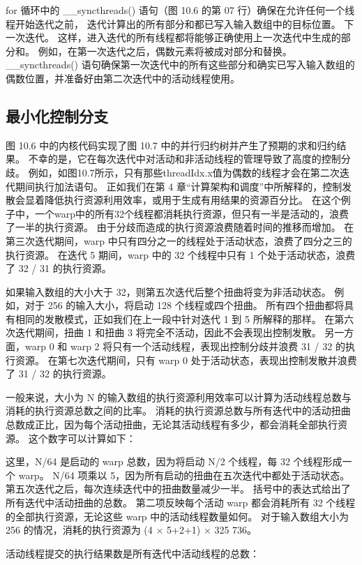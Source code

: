 for 循环中的 \_\_syncthreads() 语句（图 10.6 的第 07 行）确保在允许任何一个线程开始迭代之前，
迭代计算出的所有部分和都已写入输入数组中的目标位置。 下一次迭代。 
这样，进入迭代的所有线程都将能够正确使用上一次迭代中生成的部分和。 
例如，在第一次迭代之后，偶数元素将被成对部分和替换。 
\_\_syncthreads() 语句确保第一次迭代中的所有这些部分和确实已写入输入数组的偶数位置，并准备好由第二次迭代中的活动线程使用。

\subsection{最小化控制分支}
图 10.6 中的内核代码实现了图 10.7 中的并行归约树并产生了预期的求和归约结果。 
不幸的是，它在每次迭代中对活动和非活动线程的管理导致了高度的控制分歧。 
例如，如图10.7所示，只有那些threadIdx.x值为偶数的线程才会在第二次迭代期间执行加法语句。 
正如我们在第 4 章“计算架构和调度”中所解释的，控制发散会显着降低执行资源利用效率，或用于生成有用结果的资源百分比。 
在这个例子中，一个warp中的所有32个线程都消耗执行资源，但只有一半是活动的，浪费了一半的执行资源。 
由于分歧而造成的执行资源浪费随着时间的推移而增加。 
在第三次迭代期间，warp 中只有四分之一的线程处于活动状态，浪费了四分之三的执行资源。 
在迭代 5 期间，warp 中的 32 个线程中只有 1 个处于活动状态，浪费了 32 / 31 的执行资源。

如果输入数组的大小大于 32，则第五次迭代后整个扭曲将变为非活动状态。 
例如，对于 256 的输入大小，将启动 128 个线程或四个扭曲。 
所有四个扭曲都将具有相同的发散模式，正如我们在上一段中针对迭代 1 到 5 所解释的那样。
在第六次迭代期间，扭曲 1 和扭曲 3 将完全不活动，因此不会表现出控制发散。 
另一方面，warp 0 和 warp 2 将只有一个活动线程，表现出控制分歧并浪费 31 / 32 的执行资源。 
在第七次迭代期间，只有 warp 0 处于活动状态，表现出控制发散并浪费了 31 / 32 的执行资源。

一般来说，大小为 N 的输入数组的执行资源利用效率可以计算为活动线程总数与消耗的执行资源总数之间的比率。 
消耗的执行资源总数与所有迭代中的活动扭曲总数成正比，因为每个活动扭曲，无论其活动线程有多少，都会消耗全部执行资源。 
这个数字可以计算如下：

这里，N/64 是启动的 warp 总数，因为将启动 N/2 个线程，每 32 个线程形成一个 warp。 
N/64 项乘以 5，因为所有启动的扭曲在五次迭代中都处于活动状态。 第五次迭代之后，每次连续迭代中的扭曲数量减少一半。 
括号中的表达式给出了所有迭代中活动扭曲的总数。 
第二项反映每个活动 warp 都会消耗所有 32 个线程的全部执行资源，无论这些 warp 中的活动线程数量如何。 
对于输入数组大小为 256 的情况，消耗的执行资源为 (4 × 5+2+1) × 325 736。

活动线程提交的执行结果数是所有迭代中活动线程的总数：

